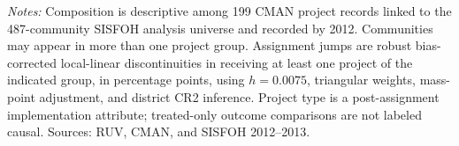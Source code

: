 \begin{table}[!htbp]
\centering
\caption{Project composition and assignment discontinuities through 2012}
\label{tab:hte-2013-ccpp-project-implementation}
\small
{}
\parbox{0.97\linewidth}{\footnotesize \textit{Notes:} Composition is descriptive among 199 CMAN project records linked to the 487-community SISFOH analysis universe and recorded by 2012. Communities may appear in more than one project group. Assignment jumps are robust bias-corrected local-linear discontinuities in receiving at least one project of the indicated group, in percentage points, using \(h=0.0075\), triangular weights, mass-point adjustment, and district CR2 inference. Project type is a post-assignment implementation attribute; treated-only outcome comparisons are not labeled causal. Sources: RUV, CMAN, and SISFOH 2012--2013.}
\end{table}
